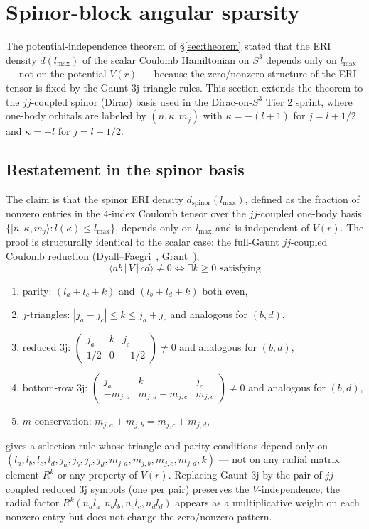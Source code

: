 \documentclass[twocolumn,pra,amsmath,amssymb,superscriptaddress]{revtex4-2}
\begin{document}
\section{Spinor-block angular sparsity}
\label{sec:paper22_spinor}

The potential-independence theorem of \S\ref{sec:theorem} stated that
the ERI density $d(l_{\max})$ of the scalar Coulomb Hamiltonian on
$S^3$ depends only on $l_{\max}$ --- not on the potential $V(r)$ ---
because the zero/nonzero structure of the ERI tensor is fixed by the
Gaunt 3j triangle rules. This section extends the theorem to the
$jj$-coupled spinor (Dirac) basis used in the Dirac-on-$S^3$ Tier 2
sprint, where one-body orbitals are labeled by $(n, \kappa, m_j)$ with
$\kappa = -(l+1)$ for $j = l + 1/2$ and $\kappa = +l$ for $j = l - 1/2$.

\subsection{Restatement in the spinor basis}

The claim is that the spinor ERI density
$d_{\mathrm{spinor}}(l_{\max})$, defined as the fraction of nonzero
entries in the 4-index Coulomb tensor over the $jj$-coupled
one-body basis $\{|n, \kappa, m_j\rangle : l(\kappa) \leq l_{\max}\}$,
depends only on $l_{\max}$ and is independent of $V(r)$.
The proof is structurally identical to the scalar case: the full-Gaunt
$jj$-coupled Coulomb reduction
(Dyall--Faegri~\cite{Dyall}, Grant~\cite{Grant}),
\[
  \langle a b \,|\, V \,|\, c d \rangle \neq 0
  \iff \exists k \geq 0 \text{ satisfying}
\]
\begin{enumerate}
  \item parity: $(l_a + l_c + k)$ and $(l_b + l_d + k)$ both even,
  \item $j$-triangles: $|j_a - j_c| \leq k \leq j_a + j_c$ and analogous for $(b, d)$,
  \item reduced 3j: $\left(\begin{smallmatrix} j_a & k & j_c \\ 1/2 & 0 & -1/2\end{smallmatrix}\right) \neq 0$ and analogous for $(b, d)$,
  \item bottom-row 3j: $\left(\begin{smallmatrix} j_a & k & j_c \\ -m_{j,a} & m_{j,a} - m_{j,c} & m_{j,c}\end{smallmatrix}\right) \neq 0$ and analogous for $(b, d)$,
  \item $m$-conservation: $m_{j,a} + m_{j,b} = m_{j,c} + m_{j,d}$,
\end{enumerate}
gives a selection rule whose triangle and parity conditions depend
only on $(l_a, l_b, l_c, l_d, j_a, j_b, j_c, j_d, m_{j,a}, m_{j,b}, m_{j,c}, m_{j,d}, k)$
--- not on any radial matrix element $R^k$ or any property of $V(r)$.
Replacing Gaunt 3j by the pair of $jj$-coupled reduced 3j symbols
(one per pair) preserves the $V$-independence; the radial factor
$R^k(n_a l_a, n_b l_b, n_c l_c, n_d l_d)$ appears as a
multiplicative weight on each nonzero entry but does not change the
zero/nonzero pattern.
\end{document}
